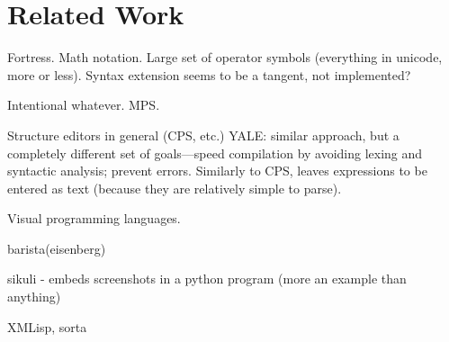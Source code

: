 \chapter{Related Work}
\todo{}

Fortress. Math notation. Large set of operator symbols (everything in unicode, more or less). Syntax extension seems to be a tangent, not implemented?

Intentional whatever. MPS. 

Structure editors in general (CPS, etc.) YALE\cite{zavodnik}: similar approach, but a completely different set of goals---speed compilation by avoiding lexing and syntactic analysis; prevent errors. Similarly to CPS, leaves expressions to be entered as text (because they are relatively simple to parse).

Visual programming languages. 

barista(eisenberg)

sikuli - embeds screenshots in a python program (more an example than anything)

XMLisp, sorta


















